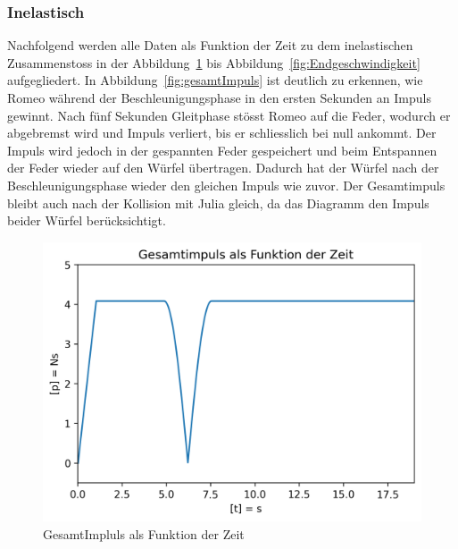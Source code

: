 \documentclass[../main.tex]{subfiles}
\begin{document}
    \subsubsection{Inelastisch}
    Nachfolgend werden alle Daten als Funktion der Zeit zu dem inelastischen Zusammenstoss in der
    Abbildung~\ref{fig:gesamtImpluls} bis Abbildung~\ref{fig:Endgeschwindigkeit}
    aufgegliedert.
    \newline
    \newline
    In Abbildung~\ref{fig:gesamtImpuls} ist deutlich zu erkennen, wie Romeo
    während der Beschleunigungsphase in den ersten Sekunden an Impuls gewinnt. 
    Nach fünf Sekunden Gleitphase stösst Romeo auf die Feder, wodurch er abgebremst
    wird und Impuls verliert, bis er schliesslich bei null ankommt. Der Impuls wird
    jedoch in der gespannten Feder gespeichert und beim Entspannen der Feder wieder
    auf den Würfel übertragen. Dadurch hat der Würfel nach der Beschleunigungsphase 
    wieder den gleichen Impuls wie zuvor. Der Gesamtimpuls bleibt auch nach der Kollision
    mit Julia gleich, da das Diagramm den Impuls beider Würfel berücksichtigt.
    \begin{figure}[H]
        \begin{center}
            \centerline{\includegraphics[width=155mm]{./images/Inelastisch/GesamtImpluls}}
            \caption{GesamtImpluls als Funktion der Zeit}
            \label{fig:gesamtImpluls}
        \end{center}
    \end{figure}
\end{document}
